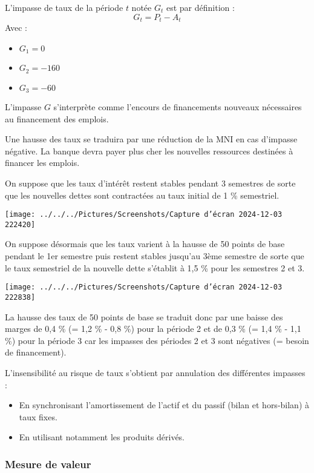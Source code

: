 \documentclass[a4paper, 12pt]{report}
\begin{document}
L'impasse de taux de la période \(t\) notée \(G_t\) est par définition : 
\[
G_t = P_t - A_t
\]
Avec :
\begin{itemize}
	\item \(G_1 = 0\)
	\item \(G_2 = -160\)
	\item \(G_3 = -60\)
\end{itemize}

L'impasse \(G\) s’interprète comme l’encours de financements nouveaux nécessaires au financement des emplois. 

Une hausse des taux se traduira par une réduction de la MNI en cas d’impasse négative. La banque devra payer plus cher les nouvelles ressources destinées à financer les emplois.

On suppose que les taux d’intérêt restent stables pendant 3 semestres de sorte que les nouvelles dettes sont contractées au taux initial de 1 \% semestriel.
\begin{center}
	\texttt{[image: ../../../Pictures/Screenshots/Capture d'écran 2024-12-03 222420]}
\end{center}

On suppose désormais que les taux varient à la hausse de 50 points de base pendant le 1er semestre puis restent stables jusqu’au 3ème semestre de sorte que le taux semestriel de la nouvelle dette s’établit à 1,5 \% pour les semestres 2 et 3.

\begin{center}
	\texttt{[image: ../../../Pictures/Screenshots/Capture d'écran 2024-12-03 222838]}
\end{center}

La hausse des taux de 50 points de base se traduit donc par une baisse des marges de 0,4 \% (= 1,2 \% - 0,8 \%) pour la période 2 et de 0,3 \% (= 1,4 \% - 1,1 \%) pour la période 3 car les impasses des périodes 2 et 3 sont négatives (= besoin de financement).

L'insensibilité au risque de taux s’obtient par annulation des différentes impasses :
\begin{itemize}
	\item En synchronisant l’amortissement de l’actif et du passif (bilan et hors-bilan) à taux fixes.
	\item En utilisant notamment les produits dérivés.
\end{itemize}

\subsubsection{Mesure de valeur}
\end{document}
